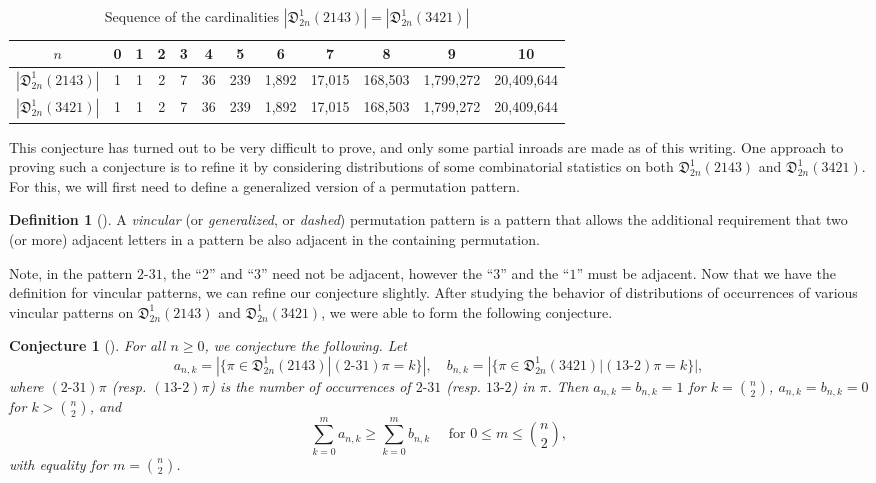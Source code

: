 \documentclass[
final
]{dmtcs-episciences}
\newtheorem{conjecture}[theorem]{Conjecture}
\theoremstyle{definition}
\newtheorem{definition}[theorem]{Definition}
\theoremstyle{remark}
\begin{document}
\begin{table}[ht]
\begin{center}
\begin{tabular}{c||c|c|c|c|c|c|c|c|c|c|c}
	$n$ &0 & 1 & 2 & 3 & 4 & 5 & 6 & 7 & 8 &9 &10\\
	\hline 
	$|\mathfrak{D}^1_{2n} (2143)|$ & 1 & 1 & 2 & 7 & 36 & 239 & 1,892 & 17,015 & 168,503 & 1,799,272 & 20,409,644\\
	\hline 
	$|\mathfrak{D}^1_{2n} (3421)|$ & 1 & 1 & 2 & 7 & 36 & 239 & 1,892 & 17,015 & 168,503 & 1,799,272 & 20,409,644
\end{tabular}
\caption{Sequence of the cardinalities $|\mathfrak{D}^1_{2n} (2143)| = |\mathfrak{D}^1_{2n} (3421)|$}
\label{table:D1}
\end{center}
\end{table}


This conjecture has turned out to be very difficult to prove, and only some partial inroads are made as of this writing. One approach to proving such a conjecture is to refine it by considering distributions of some combinatorial statistics on both $\mathfrak{D}^1_{2n} (2143)$ and $\mathfrak{D}^1_{2n} (3421)$. For this, we will first need to define a generalized version of a permutation pattern.

\begin{definition}[\cite{Babson}]
A \emph{vincular} (or \emph{generalized}, or \emph{dashed}) permutation pattern is a pattern that allows the additional requirement that two (or more) adjacent letters in a pattern be also adjacent in the containing permutation.
\end{definition}

Note, in the pattern $2\text{-}31$, the ``$2$'' and ``$3$'' need not be adjacent, however the ``$3$'' and the ``$1$'' must be adjacent.  Now that we have the definition for vincular patterns, we can refine our conjecture slightly.  After studying the behavior of distributions of occurrences of various vincular patterns on $\mathfrak{D}^1_{2n}(2143)$ and $\mathfrak{D}^1_{2n}(3421)$, we were able to form the following conjecture.

\begin{conjecture}[\cite{Burstein_Jones}]
For all $n \ge 0$, we conjecture the following.
Let
\[
a_{n,k} = |\{\pi \in \mathfrak{D}^1_{2n} (2143) | (2\text{-}31)\pi = k\}|, \quad
b_{n,k} = |\{\pi \in \mathfrak{D}^1_{2n} (3421) | (13\text{-}2)\pi = k\}|,
\]
where $(2\text{-}31)\pi$ (resp. $(13\text{-}2)\pi$) is the number of occurrences of $2\text{-}31$ (resp. $13\text{-}2$) in $\pi$. Then $a_{n,k} = b_{n,k}=1$ for $k=\binom{n}{2}$, $a_{n,k} = b_{n,k}=0$ for $k>\binom{n}{2}$, and
\[
\sum_{k=0}^{m}a_{n,k} \ge \sum_{k=0}^{m} b_{n,k} \quad \text{ for } 0 \le m \le \binom{n}{2},
\]
with equality for $m = \binom{n}{2}$.
\end{conjecture}
\end{document}

